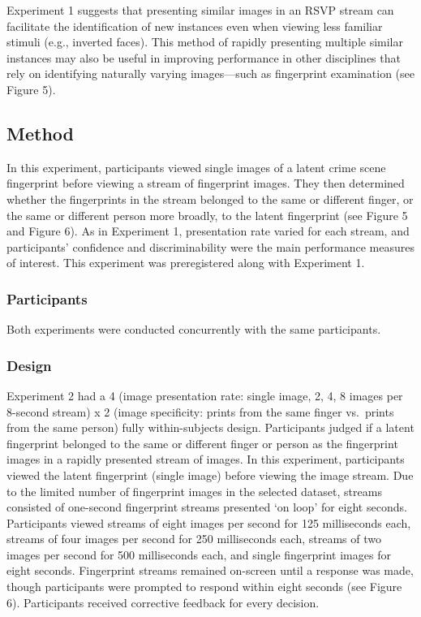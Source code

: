 \documentclass[
  english,
  man]{apa6}
\begin{document}
Experiment 1 suggests that presenting similar images in an RSVP stream can facilitate the identification of new instances even when viewing less familiar stimuli (e.g., inverted faces). This method of rapidly presenting multiple similar instances may also be useful in improving performance in other disciplines that rely on identifying naturally varying images---such as fingerprint examination (see Figure 5).

\hypertarget{method}{%
\subsection{Method}\label{method}}

In this experiment, participants viewed single images of a latent crime scene fingerprint before viewing a stream of fingerprint images. They then determined whether the fingerprints in the stream belonged to the same or different finger, or the same or different person more broadly, to the latent fingerprint (see Figure 5 and Figure 6). As in Experiment 1, presentation rate varied for each stream, and participants' confidence and discriminability were the main performance measures of interest. This experiment was preregistered along with Experiment 1.

\hypertarget{participants-1}{%
\subsubsection{Participants}\label{participants-1}}

Both experiments were conducted concurrently with the same participants.

\hypertarget{design-1}{%
\subsubsection{Design}\label{design-1}}

Experiment 2 had a 4 (image presentation rate: single image, 2, 4, 8 images per 8-second stream) x 2 (image specificity: prints from the same finger vs.~prints from the same person) fully within-subjects design. Participants judged if a latent fingerprint belonged to the same or different finger or person as the fingerprint images in a rapidly presented stream of images. In this experiment, participants viewed the latent fingerprint (single image) before viewing the image stream. Due to the limited number of fingerprint images in the selected dataset, streams consisted of one-second fingerprint streams presented `on loop' for eight seconds. Participants viewed streams of eight images per second for 125 milliseconds each, streams of four images per second for 250 milliseconds each, streams of two images per second for 500 milliseconds each, and single fingerprint images for eight seconds. Fingerprint streams remained on-screen until a response was made, though participants were prompted to respond within eight seconds (see Figure 6). Participants received corrective feedback for every decision.
\end{document}
